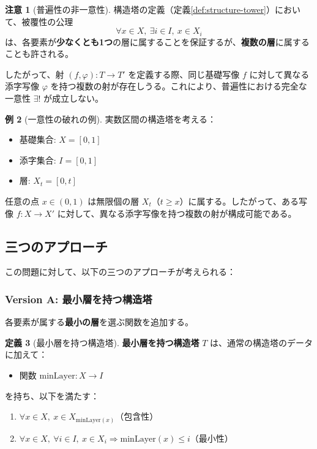 \documentclass[a4paper,12pt]{ltjsarticle}
\theoremstyle{definition}
\newtheorem{definition}{定義}[section]
\newtheorem{example}[definition]{例}
\newtheorem{remark}[definition]{注意}
\begin{document}
\begin{remark}[普遍性の非一意性]
\label{rem:non-uniqueness-issue}
構造塔の定義（定義\ref{def:structure-tower}）において、被覆性の公理
\[
\forall x \in X,\ \exists i \in I,\ x \in X_i
\]
は、各要素が\textbf{少なくとも1つ}の層に属することを保証するが、\textbf{複数の層}に属することも許される。

したがって、射 $(f, \varphi): T \to T'$ を定義する際、同じ基礎写像 $f$ に対して異なる添字写像 $\varphi$ を持つ複数の射が存在しうる。これにより、普遍性における完全な一意性 $\exists!$ が成立しない。
\end{remark}

\begin{example}[一意性の破れの例]
実数区間の構造塔を考える：
\begin{itemize}
\item 基礎集合: $X = [0, 1]$
\item 添字集合: $I = [0, 1]$
\item 層: $X_t = [0, t]$
\end{itemize}

任意の点 $x \in (0, 1)$ は無限個の層 $X_t$（$t \geq x$）に属する。したがって、ある写像 $f: X \to X'$ に対して、異なる添字写像を持つ複数の射が構成可能である。
\end{example}

\subsection{三つのアプローチ}

この問題に対して、以下の三つのアプローチが考えられる：

\subsubsection{Version A: 最小層を持つ構造塔}

各要素が属する\textbf{最小の層}を選ぶ関数を追加する。

\begin{definition}[最小層を持つ構造塔]
\label{def:tower-with-min}
\textbf{最小層を持つ構造塔} $T$ は、通常の構造塔のデータに加えて：
\begin{itemize}
\item 関数 $\mathrm{minLayer}: X \to I$
\end{itemize}
を持ち、以下を満たす：
\begin{enumerate}
\item $\forall x \in X,\ x \in X_{\mathrm{minLayer}(x)}$（包含性）
\item $\forall x \in X,\ \forall i \in I,\ x \in X_i \Rightarrow \mathrm{minLayer}(x) \leq i$（最小性）
\end{enumerate}
\end{definition}
\end{document}
